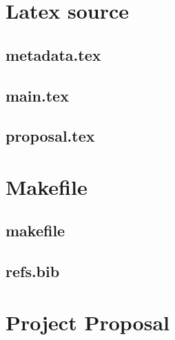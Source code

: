 \documentclass[12pt,a4paper,oneside,openright]{report}
\begin{document}


\appendix

\chapter{Latex source}

\section{metadata.tex}
{\scriptsize}

\section{main.tex}
{\scriptsize}

\section{proposal.tex}
{\scriptsize}

\chapter{Makefile}

\section{makefile}\label{makefile}
{\scriptsize}

\section{refs.bib}
{\scriptsize}


\chapter{Project Proposal}


\end{document}
